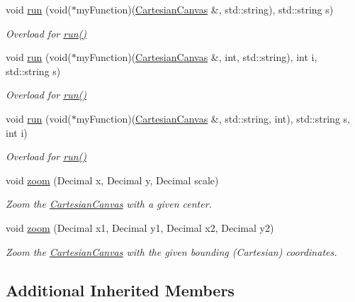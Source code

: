 \begin{DoxyCompactItemize}
void \hyperlink{classtsgl_1_1_cartesian_canvas_a7d76ab9f68d8ce7f76b6be20305a5e95}{run} (void($\ast$my\+Function)(\hyperlink{classtsgl_1_1_cartesian_canvas}{Cartesian\+Canvas} \&, std\+::string), std\+::string s)
\begin{DoxyCompactList}\small\item\em Overload for \hyperlink{classtsgl_1_1_cartesian_canvas_a63a948af53582b713957b872a765dcdb}{run()} \end{DoxyCompactList}\item 
void \hyperlink{classtsgl_1_1_cartesian_canvas_ab0bce76883df5ae48e368a7b7835aefd}{run} (void($\ast$my\+Function)(\hyperlink{classtsgl_1_1_cartesian_canvas}{Cartesian\+Canvas} \&, int, std\+::string), int i, std\+::string s)
\begin{DoxyCompactList}\small\item\em Overload for \hyperlink{classtsgl_1_1_cartesian_canvas_a63a948af53582b713957b872a765dcdb}{run()} \end{DoxyCompactList}\item 
void \hyperlink{classtsgl_1_1_cartesian_canvas_abf52fc46a6fdca1410db6feb3c67a3cd}{run} (void($\ast$my\+Function)(\hyperlink{classtsgl_1_1_cartesian_canvas}{Cartesian\+Canvas} \&, std\+::string, int), std\+::string s, int i)
\begin{DoxyCompactList}\small\item\em Overload for \hyperlink{classtsgl_1_1_cartesian_canvas_a63a948af53582b713957b872a765dcdb}{run()} \end{DoxyCompactList}\item 
void \hyperlink{classtsgl_1_1_cartesian_canvas_a69a378f61868c4c880889c33ec33c992}{zoom} (Decimal x, Decimal y, Decimal scale)
\begin{DoxyCompactList}\small\item\em Zoom the \hyperlink{classtsgl_1_1_cartesian_canvas}{Cartesian\+Canvas} with a given center. \end{DoxyCompactList}\item 
void \hyperlink{classtsgl_1_1_cartesian_canvas_adb1e999087c0ec7e4405d8ebd3ca9760}{zoom} (Decimal x1, Decimal y1, Decimal x2, Decimal y2)
\begin{DoxyCompactList}\small\item\em Zoom the \hyperlink{classtsgl_1_1_cartesian_canvas}{Cartesian\+Canvas} with the given bounding (Cartesian) coordinates. \end{DoxyCompactList}\end{DoxyCompactItemize}
\subsection*{Additional Inherited Members}


